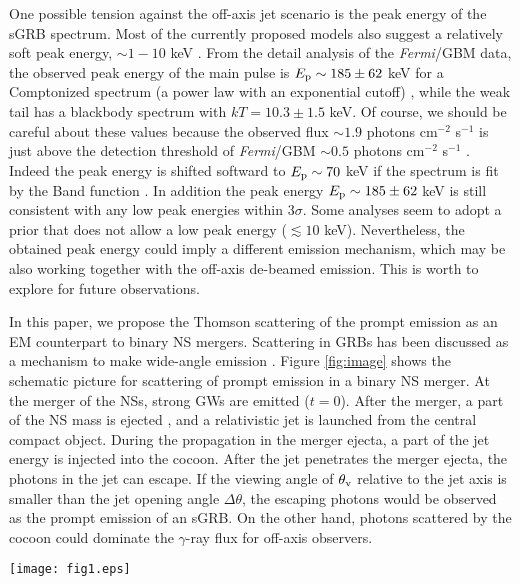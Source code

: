 \documentclass{emulateapj}
\begin{document}
One possible tension against the off-axis jet scenario
is the peak energy of the sGRB spectrum.
Most of the currently proposed models also suggest
a relatively soft peak energy, $\sim 1-10$ keV \citep[e.g., ][]{2017arXiv171005905I, 2018ApJ...852L..30P, 2017ApJ...851L..19B}.
From the detail analysis of the {\it Fermi}/GBM data, 
the observed peak energy of the main pulse is 
$E_{\rm p} \sim 185 \pm 62$ keV 
for a Comptonized spectrum (a power law with an exponential cutoff)
\citep{2017arXiv171005446G, 2017arXiv171008362B},
while the weak tail has a blackbody spectrum with $kT = 10.3 \pm 1.5$ keV.
Of course, we should be careful about these values
because the observed flux $\sim 1.9$ photons cm$^{-2}$ s$^{-1}$ is just above
the detection threshold of {\it Fermi}/GBM $\sim 0.5$ photons cm$^{-2}$ s$^{-1}$
\citep{2017GCN.21520....1V}.
Indeed the peak energy is shifted softward to 
$E_{\rm p} \sim 70$ keV
if the spectrum is fit by the Band function \citep{2017ApJ...848L..13A}. 
In addition the peak energy $E_{\rm p} \sim 185 \pm 62$ keV 
is still consistent with any low peak energies within $3 \sigma$.
Some analyses seem to adopt a prior that does not allow a low peak energy ($\lesssim10$ keV). 
Nevertheless, the obtained peak energy could imply a different emission mechanism, 
which may be also working together with the off-axis de-beamed emission.
This is worth to explore for future observations.

In this paper, we propose the Thomson scattering of the prompt emission as an EM counterpart to binary NS mergers. 
Scattering in GRBs has been discussed as a mechanism to make
wide-angle emission \citep[e.g., ][]{1998PThPh.100..921N, 1999ApJ...521L.117E, 2015ApJ...809L...8K}.
Figure \ref{fig:image} shows the schematic picture for 
scattering of prompt emission in a binary NS merger. 
At the merger of the NSs, strong GWs are emitted ($t=0$). 
After the merger, a part of the NS mass is ejected \citep[e.g., ][]{2013PhRvD..87b4001H}, and
a relativistic jet is launched from the central compact object.  
During the propagation in the merger ejecta, 
a part of the jet energy is injected into the cocoon.
After the jet penetrates the merger ejecta, the photons in the jet can escape. 
If the viewing angle of $\theta_{\rm v}$ relative to the jet axis is smaller than the jet opening angle $\Delta\theta$, 
the escaping photons would be observed as the prompt emission of an sGRB. 
On the other hand, photons scattered by the cocoon could dominate the $\gamma$-ray flux for off-axis observers.

\begin{figure*}
 \begin{center}
  \texttt{[image: fig1.eps]}
   \caption{Schematic picture for the scattered prompt sGRB.}
  \label{fig:image}
 \end{center}
\end{figure*}
\end{document}

